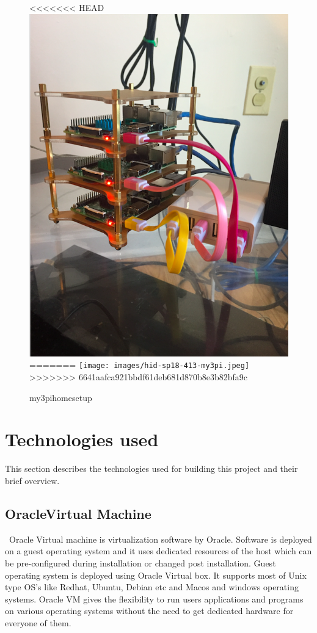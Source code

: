 \begin{figure}[!ht]
<<<<<<< HEAD
  \centering\includegraphics[width=\columnwidth]{images/hid-sp18-413-my3pi.png}
=======
  \centering\texttt{[image: images/hid-sp18-413-my3pi.jpeg]}
>>>>>>> 6641aafca921bbdf61deb681d870b8e3b82bfa9c
  \caption{my3pihomesetup}\label{F:setup}
\end{figure}

\section{Technologies used}
This section describes the technologies used for building this project
and their brief overview. 

\subsection{OracleVirtual Machine}
~\cite{hid-sp18-413-OracleVM}Oracle Virtual machine is virtualization software by Oracle. Software
is deployed on a guest operating system and it uses dedicated
resources of the host which can be pre-configured during installation
or changed post installation. Guest operating system is deployed using
Oracle Virtual box. It supports most of Unix type OS's like Redhat,
Ubuntu, Debian etc and Macos and windows operating systems. Oracle VM
gives the flexibility to run users applications and programs on
various operating systems without the need to get dedicated hardware
for everyone of them.


